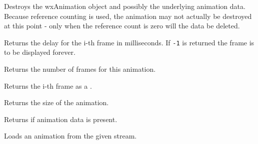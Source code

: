 
Destroys the wxAnimation object and possibly the underlying animation data.
Because reference counting is used, the animation may not actually be
destroyed at this point - only when the reference count is zero will the
data be deleted.


\label{wxanimationgetdelay}


Returns the delay for the i-th frame in milliseconds.
If {\tt -1} is returned the frame is to be displayed forever.


\label{wxanimationgetframecount}


Returns the number of frames for this animation.


\label{wxanimationgetframe}


Returns the i-th frame as a .


\label{wxanimationgetsize}


Returns the size of the animation.


\label{wxanimationisok}


Returns \true if animation data is present.


\label{wxanimationload}


Loads an animation from the given stream.




